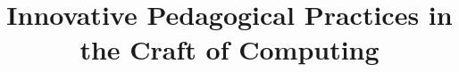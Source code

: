 \documentclass[conference,compsoc]{IEEEtran}
\begin{document}
%
\title{Innovative Pedagogical Practices in the Craft of Computing}


\author{ %
\and
\IEEEauthorblockN{\TC}
}


% 
\end{document}
